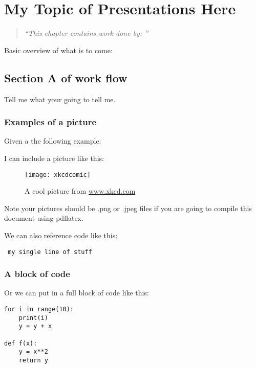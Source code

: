 \chapter{My Topic of Presentations Here}
\begin{quote}\it
``This chapter contains work done by: ''
\end{quote}
\label{chapter:mytopicofpresentationhere}

Basic overview of what is to come:

\section{Section A of work flow}
Tell me what your going to tell me. 

\subsection{Examples of a picture}
Given a the following example: 

I can include a picture like this: 
\begin{center}
\begin{figure}
\centering
\texttt{[image: xkcdcomic]}
\caption{A cool picture from \url{www.xkcd.com}}
\label{fig:xkcdcomic}
\end{figure}
\end{center}
Note your pictures should be .png or .jpeg files if you are going to compile this document using pdflatex. 

We can also reference code like this: 
\begin{center}
\verb' my single line of stuff '
\end{center}

\subsection{A block of code}
Or we can put in a full block of code like this: 
\begin{center}
\begin{lstlisting}[caption={A block of code}]
for i in range(10):
    print(i)
    y = y + x
    
def f(x):
    y = x**2
    return y    
\end{lstlisting}
\end{center}
